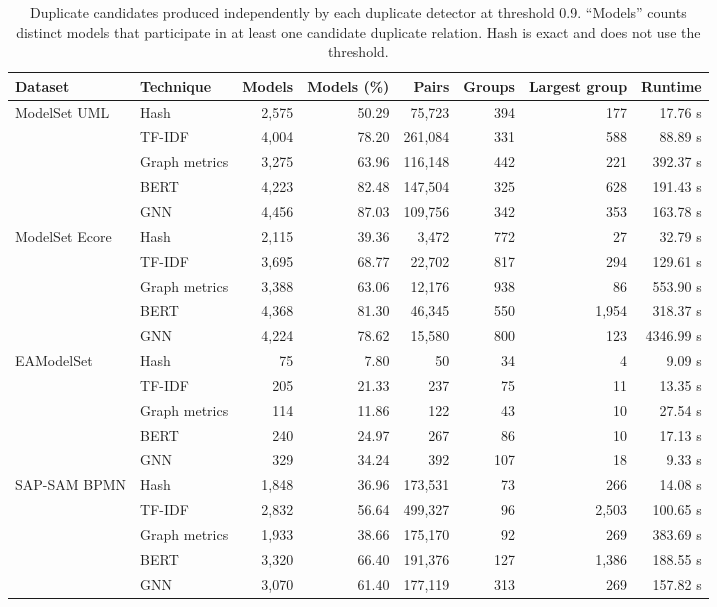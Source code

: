 \begin{table}[t]
    \centering
    \caption{Duplicate candidates produced independently by each duplicate detector at threshold 0.9. ``Models'' counts distinct models that participate in at least one candidate duplicate relation. Hash is exact and does not use the threshold.}
    \label{tab:duplicate-results}
    \begin{tabular}{llrrrrrr}
        \toprule
        Dataset & Technique & Models & Models (\%) & Pairs & Groups & Largest group & Runtime \\
        \midrule
        \multirow{5}{*}{ModelSet UML} & Hash & 2,575 & 50.29 & 75,723 & 394 & 177 & 17.76 s \\
         & TF-IDF & 4,004 & 78.20 & 261,084 & 331 & 588 & 88.89 s \\
         & Graph metrics & 3,275 & 63.96 & 116,148 & 442 & 221 & 392.37 s \\
         & BERT & 4,223 & 82.48 & 147,504 & 325 & 628 & 191.43 s \\
         & GNN & 4,456 & 87.03 & 109,756 & 342 & 353 & 163.78 s \\
        \midrule
        \multirow{5}{*}{ModelSet Ecore} & Hash & 2,115 & 39.36 & 3,472 & 772 & 27 & 32.79 s \\
         & TF-IDF & 3,695 & 68.77 & 22,702 & 817 & 294 & 129.61 s \\
         & Graph metrics & 3,388 & 63.06 & 12,176 & 938 & 86 & 553.90 s \\
         & BERT & 4,368 & 81.30 & 46,345 & 550 & 1,954 & 318.37 s \\
         & GNN & 4,224 & 78.62 & 15,580 & 800 & 123 & 4346.99 s \\
        \midrule
        \multirow{5}{*}{EAModelSet} & Hash & 75 & 7.80 & 50 & 34 & 4 & 9.09 s \\
         & TF-IDF & 205 & 21.33 & 237 & 75 & 11 & 13.35 s \\
         & Graph metrics & 114 & 11.86 & 122 & 43 & 10 & 27.54 s \\
         & BERT & 240 & 24.97 & 267 & 86 & 10 & 17.13 s \\
         & GNN & 329 & 34.24 & 392 & 107 & 18 & 9.33 s \\
        \midrule
        \multirow{5}{*}{SAP-SAM BPMN} & Hash & 1,848 & 36.96 & 173,531 & 73 & 266 & 14.08 s \\
         & TF-IDF & 2,832 & 56.64 & 499,327 & 96 & 2,503 & 100.65 s \\
         & Graph metrics & 1,933 & 38.66 & 175,170 & 92 & 269 & 383.69 s \\
         & BERT & 3,320 & 66.40 & 191,376 & 127 & 1,386 & 188.55 s \\
         & GNN & 3,070 & 61.40 & 177,119 & 313 & 269 & 157.82 s \\
        \bottomrule
    \end{tabular}
\end{table}
